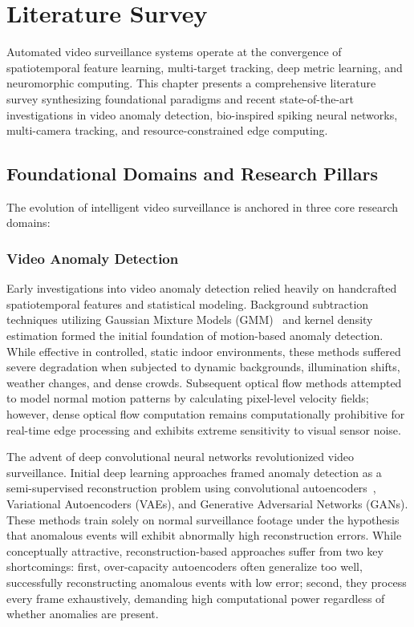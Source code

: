 \documentclass[12pt,a4paper]{report}
\begin{document}
\chapter[Literature Survey]{\Huge Literature Survey}

Automated video surveillance systems operate at the convergence of spatiotemporal feature learning, multi-target tracking, deep metric learning, and neuromorphic computing. This chapter presents a comprehensive literature survey synthesizing foundational paradigms and recent state-of-the-art investigations in video anomaly detection, bio-inspired spiking neural networks, multi-camera tracking, and resource-constrained edge computing.

\section{Foundational Domains and Research Pillars}
The evolution of intelligent video surveillance is anchored in three core research domains:

\subsection{Video Anomaly Detection}
Early investigations into video anomaly detection relied heavily on handcrafted spatiotemporal features and statistical modeling. Background subtraction techniques utilizing Gaussian Mixture Models (GMM)~\cite{ref_stauffer1999_gmm} and kernel density estimation formed the initial foundation of motion-based anomaly detection. While effective in controlled, static indoor environments, these methods suffered severe degradation when subjected to dynamic backgrounds, illumination shifts, weather changes, and dense crowds. Subsequent optical flow methods attempted to model normal motion patterns by calculating pixel-level velocity fields; however, dense optical flow computation remains computationally prohibitive for real-time edge processing and exhibits extreme sensitivity to visual sensor noise.

The advent of deep convolutional neural networks revolutionized video surveillance. Initial deep learning approaches framed anomaly detection as a semi-supervised reconstruction problem using convolutional autoencoders~\cite{ref_hasan2016_regularity}, Variational Autoencoders (VAEs), and Generative Adversarial Networks (GANs). These methods train solely on normal surveillance footage under the hypothesis that anomalous events will exhibit abnormally high reconstruction errors. While conceptually attractive, reconstruction-based approaches suffer from two key shortcomings: first, over-capacity autoencoders often generalize too well, successfully reconstructing anomalous events with low error; second, they process every frame exhaustively, demanding high computational power regardless of whether anomalies are present.
\end{document}
